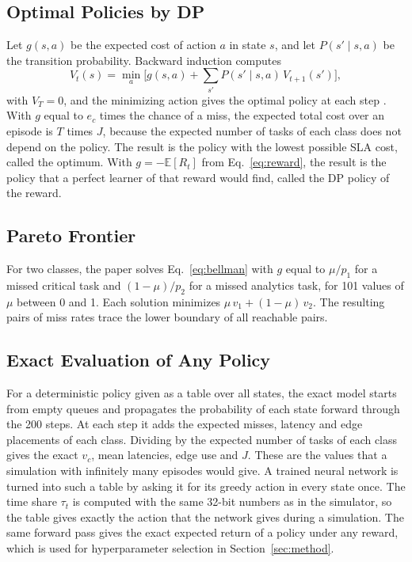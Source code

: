 \subsection{Optimal Policies by DP}
Let $g(s,a)$ be the expected cost of action $a$ in state $s$, and let $P(s' \mid s,a)$ be the transition probability. Backward induction computes
\begin{equation}
V_t(s) = \min_{a} \Big[ g(s,a) + \sum_{s'} P(s' \mid s, a)\, V_{t+1}(s') \Big],
\label{eq:bellman}
\end{equation}
with $V_T = 0$, and the minimizing action gives the optimal policy at each step \cite{puterman1994}. With $g$ equal to $e_c$ times the chance of a miss, the expected total cost over an episode is $T$ times $J$, because the expected number of tasks of each class does not depend on the policy. The result is the policy with the lowest possible SLA cost, called the optimum. With $g = -\mathbb{E}[R_t]$ from Eq.~\eqref{eq:reward}, the result is the policy that a perfect learner of that reward would find, called the DP policy of the reward.

\subsection{Pareto Frontier}
For two classes, the paper solves Eq.~\eqref{eq:bellman} with $g$ equal to $\mu/p_1$ for a missed critical task and $(1-\mu)/p_2$ for a missed analytics task, for 101 values of $\mu$ between 0 and 1. Each solution minimizes $\mu\, v_1 + (1-\mu)\, v_2$. The resulting pairs of miss rates trace the lower boundary of all reachable pairs.

\subsection{Exact Evaluation of Any Policy}
For a deterministic policy given as a table over all states, the exact model starts from empty queues and propagates the probability of each state forward through the 200 steps. At each step it adds the expected misses, latency and edge placements of each class. Dividing by the expected number of tasks of each class gives the exact $v_c$, mean latencies, edge use and $J$. These are the values that a simulation with infinitely many episodes would give. A trained neural network is turned into such a table by asking it for its greedy action in every state once. The time share $\tau_t$ is computed with the same 32-bit numbers as in the simulator, so the table gives exactly the action that the network gives during a simulation. The same forward pass gives the exact expected return of a policy under any reward, which is used for hyperparameter selection in Section~\ref{sec:method}.


